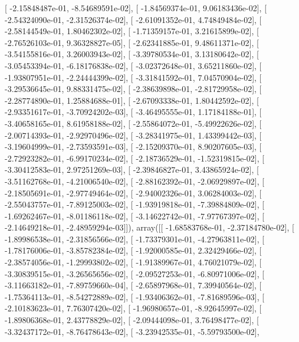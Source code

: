 \documentclass{article}
\begin{document}
       [ -2.15848487e-01,  -8.54689591e-02],
       [ -1.84569374e-01,   9.06183436e-02],
       [ -2.54324090e-01,  -2.31526374e-02],
       [ -2.61091352e-01,   4.74849484e-02],
       [ -2.58144549e-01,   1.80462302e-02],
       [ -1.71359157e-01,   3.21615899e-02],
       [ -2.76526103e-01,   9.36328827e-05],
       [ -2.62341885e-01,   9.48611371e-02],
       [ -3.54155816e-01,   3.26003943e-02],
       [ -3.39780534e-01,   3.13180642e-02],
       [ -3.05453394e-01,  -6.18176838e-02],
       [ -3.02372648e-01,   3.65211860e-02],
       [ -1.93807951e-01,  -2.24444399e-02],
       [ -3.31841592e-01,   7.04570904e-02],
       [ -3.29536645e-01,   9.88331475e-02],
       [ -2.38639898e-01,  -2.81729958e-02],
       [ -2.28774890e-01,   1.25884688e-01],
       [ -2.67093338e-01,   1.80442592e-02],
       [ -2.93351617e-01,  -3.70924202e-03],
       [ -3.46495555e-01,   1.17184188e-01],
       [ -3.40658165e-01,   8.61958188e-02],
       [ -2.55864072e-01,  -5.49922626e-02],
       [ -2.00714393e-01,  -2.92970496e-02],
       [ -3.28341975e-01,   1.43399442e-03],
       [ -3.19604999e-01,  -2.73593591e-03],
       [ -2.15209370e-01,   8.90207605e-03],
       [ -2.72923282e-01,  -6.99170234e-02],
       [ -2.18736529e-01,  -1.52319815e-02],
       [ -3.30412583e-01,   2.97251269e-03],
       [ -2.39846827e-01,   3.43865924e-02],
       [ -3.51162768e-01,  -4.21006540e-02],
       [ -2.88162392e-01,  -2.06929897e-02],
       [ -2.18505691e-01,  -2.97749464e-02],
       [ -2.94002326e-01,   3.06284003e-02],
       [ -2.55043757e-01,  -7.89125003e-02],
       [ -1.93919818e-01,  -7.39884809e-02],
       [ -1.69262467e-01,  -8.01186118e-02],
       [ -3.14622742e-01,  -7.97767397e-02],
       [ -2.14649218e-01,  -2.48959294e-03]]), array([[ -1.68583768e-01,  -2.37184780e-02],
       [ -1.89986538e-01,  -2.31856566e-02],
       [ -1.73379301e-01,  -4.27963811e-02],
       [ -1.78176006e-01,  -3.85782384e-02],
       [ -1.92000585e-01,   2.32429466e-02],
       [ -2.38574056e-01,  -1.29993802e-02],
       [ -1.91389967e-01,   4.76021079e-02],
       [ -3.30839515e-01,  -3.26565656e-02],
       [ -2.09527253e-01,  -6.80971006e-02],
       [ -3.11663182e-01,  -7.89759660e-04],
       [ -2.65897968e-01,   7.39940564e-02],
       [ -1.75364113e-01,  -8.54272889e-02],
       [ -1.93406362e-01,  -7.81689596e-03],
       [ -2.10183623e-01,   7.76307420e-02],
       [ -1.96980657e-01,  -8.92645997e-02],
       [ -1.89806368e-01,   2.43778829e-02],
       [ -2.09444098e-01,   3.76498477e-02],
       [ -3.32437172e-01,  -8.76478643e-02],
       [ -3.23942535e-01,  -5.59793500e-02],
\end{document}
